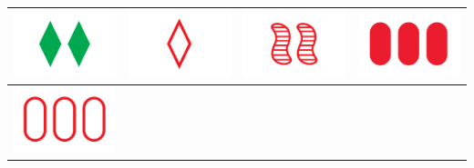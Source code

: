 \documentclass[a4paper,12pt,titlepage]{article}
\theoremstyle{plain}
\theoremstyle{definition}
\begin{document}
\begin{table}[h]
\centering
\begin{tabular}{ c | c | c | c }
\includegraphics[scale=0.2]{Img/1012.png} &
\includegraphics[scale=0.2]{Img/0202.png} &
\includegraphics[scale=0.2]{Img/1101.png} &
\includegraphics[scale=0.2]{Img/2000.png} \\
\hline
\includegraphics[scale=0.2]{Img/2200.png} &

\end{tabular}
\end{table}
\end{document}
